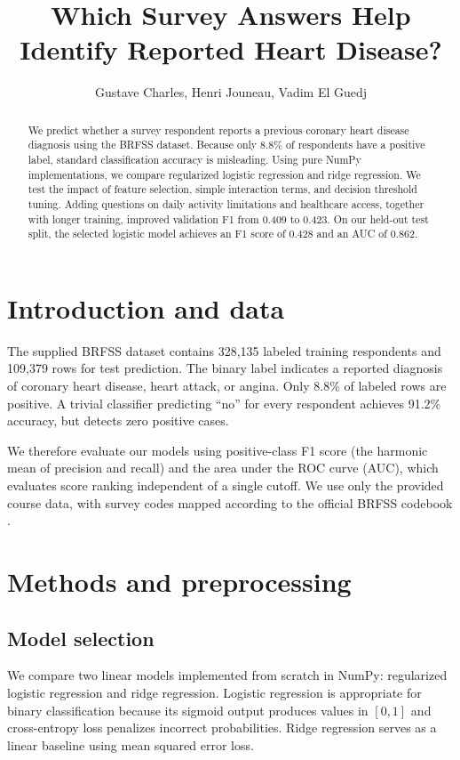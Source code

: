 \documentclass[10pt,conference,compsocconf]{latex-example-paper/IEEEtran}
\begin{document}
\title{Which Survey Answers Help Identify Reported Heart Disease?}
\author{Gustave Charles, Henri Jouneau, Vadim El Guedj}
\maketitle

\begin{abstract}
We predict whether a survey respondent reports a previous coronary heart disease diagnosis using the BRFSS dataset. Because only 8.8\% of respondents have a positive label, standard classification accuracy is misleading. Using pure NumPy implementations, we compare regularized logistic regression and ridge regression. We test the impact of feature selection, simple interaction terms, and decision threshold tuning. Adding questions on daily activity limitations and healthcare access, together with longer training, improved validation F1 from 0.409 to 0.423. On our held-out test split, the selected logistic model achieves an F1 score of 0.428 and an AUC of 0.862.
\end{abstract}

\section{Introduction and data}
The supplied BRFSS dataset contains 328,135 labeled training respondents and 109,379 rows for test prediction. The binary label indicates a reported diagnosis of coronary heart disease, heart attack, or angina. Only 8.8\% of labeled rows are positive. A trivial classifier predicting ``no'' for every respondent achieves 91.2\% accuracy, but detects zero positive cases.

We therefore evaluate our models using positive-class F1 score (the harmonic mean of precision and recall) and the area under the ROC curve (AUC), which evaluates score ranking independent of a single cutoff. We use only the provided course data, with survey codes mapped according to the official BRFSS codebook \cite{cdc}.

\section{Methods and preprocessing}
\subsection{Model selection}
We compare two linear models implemented from scratch in NumPy: regularized logistic regression and ridge regression. Logistic regression is appropriate for binary classification because its sigmoid output produces values in $[0,1]$ and cross-entropy loss penalizes incorrect probabilities. Ridge regression serves as a linear baseline using mean squared error loss.
\end{document}

